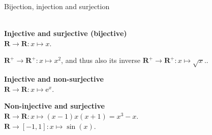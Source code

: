 \documentclass[aspectratio=169]{beamer}
\begin{document}
\begin{frame}[t]{Bijection, injection and surjection}
\framesubtitle{}
\vspace{-0.5cm}
\begin{columns}[T,onlytextwidth]
    \begin{column}{0.49\textwidth}
        \textbf{Injective and surjective (bijective)}\\
$\mathbf {R} \to \mathbf {R} :x\mapsto x.$

$\mathbf {R} ^{+}\to \mathbf {R} ^{+}:x\mapsto x^{2}$, and thus also its inverse $\mathbf {R} ^{+}\to \mathbf {R} ^{+}:x\mapsto {\sqrt {x}}.$.

\textbf{Injective and non-surjective}\\
$\mathbf {R} \to \mathbf {R} :x\mapsto \mathrm {e} ^{x}$.

\textbf{Non-injective and surjective}\\
$\mathbf {R} \to \mathbf {R} :x\mapsto (x-1)x(x+1)=x^{3}-x.$\\
$\mathbf {R} \to [-1,1]:x\mapsto \sin(x).$


\end{column}
\end{columns}
\end{frame}
\end{document}
